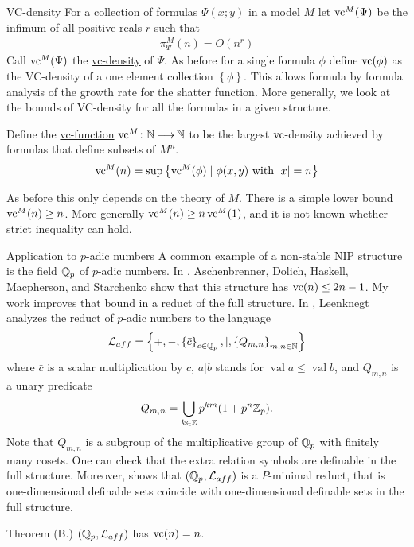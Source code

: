 \documentclass[final]{beamer}
\newcommand{\curly}[1]{\left\{ #1 \right\}}
\newcommand{\defn}{\underline}
\DeclareMathOperator{\vval}{val}
\newlength{\onecolwid}
\begin{document}
\begin{frame}[t]
\begin{columns}[t]
\begin{column}{\onecolwid}
\begin{block}{VC-density}
        For a collection of formulas $\Psi(x; y)$ in a model $M$ let $\operatorname{vc}^M(\Psi)$ be the infimum of all positive reals $r$ such that
            \begin{align*}
                \pi^M_\Psi(n) = O(n^r)
            \end{align*}
            Call $\operatorname{vc}^M(\Psi)$ the \defn{vc-density} of $\Psi$.
        As before for a single formula $\phi$ define $\operatorname{vc}(\phi)$ as the VC-density of a one element collection $\curly{\phi}$.
        This allows formula by formula analysis of the growth rate for the shatter function.
        More generally, we look at the bounds of VC-density for all the formulas in a given structure.

        Define the \defn{vc-function} $\operatorname{vc}^M \colon \mathbb{N} \operatorname{\longrightarrow} \mathbb{N}$ to be the largest $\operatorname{vc}$-density achieved by formulas
        that define subsets of $M^n$.
            \begin{align*}
                \vc^M(n) = \sup \curly{ \vc^M(\phi) \mid \phi(x, y) \text{ with } |x| = n}
            \end{align*}        

        As before this only depends on the theory of $M$.
        There is a simple lower bound $\operatorname{vc}^M(n) \geq n$.
        More generally $\operatorname{vc}^M(n) \geq n\operatorname{vc}^M(1)$, and it is not known whether strict inequality can hold.
    \end{block}

    \begin{block}{Application to $p$-adic numbers}
        A common example of a non-stable NIP structure is the field $\mathbb{Q}_p$ of $p$-adic numbers.
	In \cite{density}, Aschenbrenner, Dolich, Haskell, Macpherson, and Starchenko show that this structure has $\operatorname{vc}(n) \leq 2n - 1$.
        My work improves that bound in a reduct of the full structure.
        In \cite{reduct}, Leenknegt analyzes the reduct of $p$-adic numbers to the language
        \begin{align*}
            \LL_{aff}  = \curly{+, -, \curly{\bar c}_{c \in \Q_p}, |, \curly{Q_{m,n}}_{m,n\in \N}}
        \end{align*}
        where $\bar c$ is a scalar multiplication by $c$,
        $a | b$ stands for $\vval a \leq \vval b$,
        and $Q_{m,n}$ is a unary predicate
        \begin{align*}
            Q_{m,n} = \bigcup_{k \in \mathbb{Z}} p^{km} (1 + p^n\mathbb{Z}_p).
        \end{align*}
	Note that $Q_{m,n}$ is a subgroup of the multiplicative group of $\mathbb{Q}_p$ with finitely many cosets.
        One can check that the extra relation symbols are definable in the full structure.
        Moreover, \cite{reduct} shows that $(\mathbb{Q}_p, \mathcal L_{aff})$ is a $P$-minimal reduct,
        that is one-dimensional definable sets coincide with one-dimensional definable sets in the full structure.
        \begin{alertblock} {Theorem (B.)}
            $(\mathbb{Q}_p, \mathcal L_{aff})$ has $\operatorname{vc}(n) = n$.
        \end{alertblock}
    \end{block}
    

\end{column}
\end{columns}
\end{frame}
\end{document}
